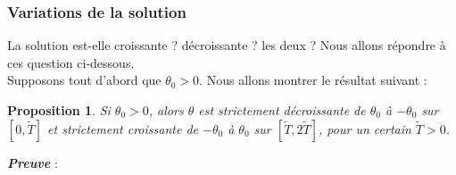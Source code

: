 \documentclass[9pt,a4paper]{article}
\newtheorem{prop}{Proposition}
\begin{document}
\subsubsection{Variations de la solution}
La solution est-elle croissante ? décroissante ? les deux ? Nous allons répondre à ces question ci-dessous.\\
Supposons tout d'abord que $\theta_0 > 0$. Nous allons montrer le résultat suivant :
\begin{tcolorbox}[colback=green!5!white, colframe=green!50!black]
    \begin{prop}
        Si $\theta_0 > 0$, alors $\theta$ est strictement décroissante de $\theta_0$ à $-\theta_0$ sur $[0, \tilde{T}]$ et strictement croissante de $-\theta_0$ à $\theta_0$ sur $[\tilde{T}, 2\tilde{T}]$, pour un certain $\tilde{T} > 0$.
    \end{prop}
\end{tcolorbox}
\textbf{\textit{Preuve}} :
\end{document}
